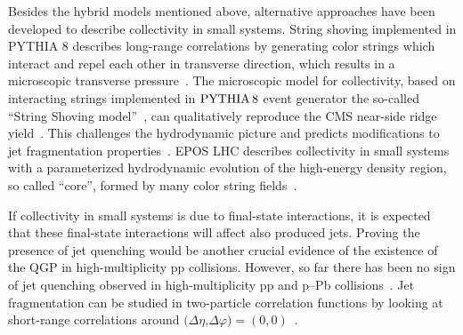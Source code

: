 Besides the hybrid models mentioned above, alternative approaches have been developed to describe collectivity in small systems. String shoving implemented in PYTHIA 8 describes long-range correlations by generating color strings which interact and repel each other in transverse direction, which results in a microscopic transverse pressure~\cite{Bierlich:2017vhg}. The microscopic model for collectivity, based on interacting strings implemented in $\mathrm{PYTHIA}\,8$ event generator the so-called ``String Shoving model''~\cite{Bierlich:2017vhg}, can qualitatively reproduce the CMS near-side ridge yield~\cite{Khachatryan:2016txc}. This challenges the hydrodynamic picture and predicts modifications to jet fragmentation properties~\cite{Bierlich:2019ixq}.
EPOS LHC describes collectivity in small systems with a parameterized hydrodynamic evolution of the high-energy density region, so called ``core'', formed by many color string fields~\cite{Pierog:2013ria}.

If collectivity in small systems is due to final-state interactions, it is expected 
that these final-state interactions will affect also produced jets. Proving the presence of jet quenching would be another crucial evidence of the existence of the QGP in high-multiplicity pp collisions. However, so far there has been no sign of jet quenching observed in high-multiplicity pp and p--Pb collisions~\cite{Khachatryan:2016odn,Adam:2016jfp,Adam:2016dau,Acharya:2017okq}. Jet fragmentation can be studied in two-particle correlation functions by looking at short-range correlations around $(\Delta\eta$,$\Delta\varphi)=(0,0)$~\cite{Adam:2016tsv}.  


% 

